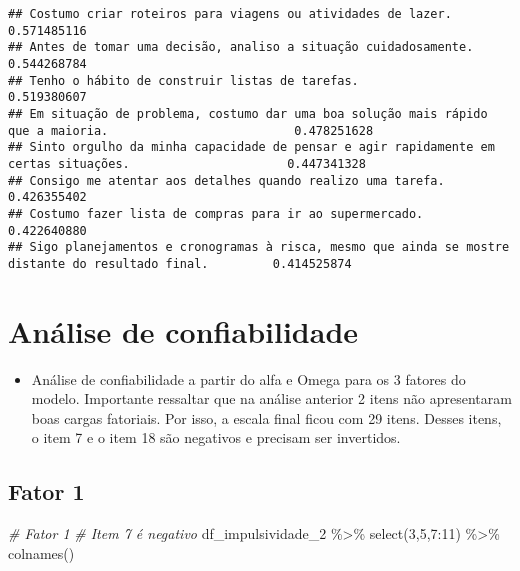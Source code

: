 \documentclass[
]{article}
\newenvironment{Shaded}{\begin{snugshade}}{\end{snugshade}}
\newcommand{\CommentTok}[1]{\textcolor[rgb]{0.56,0.35,0.01}{\textit{#1}}}
\newcommand{\DecValTok}[1]{\textcolor[rgb]{0.00,0.00,0.81}{#1}}
\newcommand{\FunctionTok}[1]{\textcolor[rgb]{0.00,0.00,0.00}{#1}}
\newcommand{\NormalTok}[1]{#1}
\newcommand{\SpecialCharTok}[1]{\textcolor[rgb]{0.00,0.00,0.00}{#1}}
\providecommand{\tightlist}{%
  \setlength{\itemsep}{0pt}\setlength{\parskip}{0pt}}
\begin{document}
\begin{verbatim}
## Costumo criar roteiros para viagens ou atividades de lazer.                                              0.571485116
## Antes de tomar uma decisão, analiso a situação cuidadosamente.                                           0.544268784
## Tenho o hábito de construir listas de tarefas.                                                           0.519380607
## Em situação de problema, costumo dar uma boa solução mais rápido que a maioria.                          0.478251628
## Sinto orgulho da minha capacidade de pensar e agir rapidamente em certas situações.                      0.447341328
## Consigo me atentar aos detalhes quando realizo uma tarefa.                                               0.426355402
## Costumo fazer lista de compras para ir ao supermercado.                                                  0.422640880
## Sigo planejamentos e cronogramas à risca, mesmo que ainda se mostre distante do resultado final.         0.414525874
\end{verbatim}

\hypertarget{anuxe1lise-de-confiabilidade}{%
\section{Análise de confiabilidade}\label{anuxe1lise-de-confiabilidade}}

\begin{itemize}
\tightlist
\item
  Análise de confiabilidade a partir do alfa e Omega para os 3 fatores
  do modelo. Importante ressaltar que na análise anterior 2 itens não
  apresentaram boas cargas fatoriais. Por isso, a escala final ficou com
  29 itens. Desses itens, o item 7 e o item 18 são negativos e precisam
  ser invertidos.
\end{itemize}

\hypertarget{fator-1}{%
\subsection{Fator 1}\label{fator-1}}

\begin{Shaded}
\begin{Highlighting}[]
\CommentTok{\# Fator 1}
\CommentTok{\# Item 7 é negativo}
\NormalTok{df\_impulsividade\_2 }\SpecialCharTok{\%\textgreater{}\%} \FunctionTok{select}\NormalTok{(}\DecValTok{3}\NormalTok{,}\DecValTok{5}\NormalTok{,}\DecValTok{7}\SpecialCharTok{:}\DecValTok{11}\NormalTok{) }\SpecialCharTok{\%\textgreater{}\%} \FunctionTok{colnames}\NormalTok{() }
\end{Highlighting}
\end{Shaded}
\end{document}
